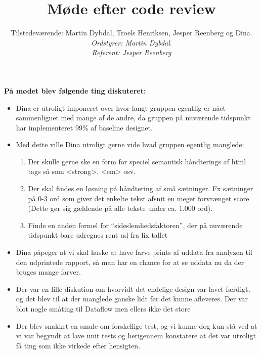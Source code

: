 \documentclass[a4paper,10pt,draft]{article}
\begin{document}
\title{Møde efter code review}
\author{Tilstedeværende: Martin Dybdal, Troels Henriksen, Jesper Reenberg og Dina.\\
\textit{Ordstyrer: Martin Dybdal}.\\
\textit{Referent: Jesper Reenberg}}
\maketitle


\textbf{På mødet blev følgende ting diskuteret:}
\\

\begin{itemize}

\item Dina er utroligt imponeret over hvor langt gruppen egentlig er nået sammenlignet med mange af de andre, da gruppen på nuværende tidspunkt har implementeret 99\% af baseline designet.

\item Med dette ville Dina utroligt gerne vide hvad gruppen egentlig manglede:

\begin{enumerate}
 \item Der skulle gerne ske en form for speciel semantisk håndterings af html tags så som <strong>, <em> osv.
\item Der skal findes en løsning på håndtering af små sætninger. Fx sætninger på 0-3 ord som giver det enkelte tekst afsnit en meget forvrænget score (Dette gør sig gældende på alle tekste under ca. 1.000 ord).
\item Finde en anden formel for ``sideslemhedsfaktoren'', der på nuværende tidspunkt bare udregnes rent ud fra lix tallet
\end{enumerate}

\item Dina påpeger at vi skal huske at have farve prints af uddata fra analyzen til den udprintede rapport, så man har en chance for at se uddata nu da der bruges mange farver.

\item Der var en lille diskution om hvorvidt det endelige design var lavet færdigt, og det blev til at der manglede ganske lidt før det kunne afleveres. Der var blot nogle småting til Dataflow men ellers ikke det store

\item Der blev snakket en smule om forskellige test, og vi kunne dog kun stå ved at vi var begyndt at lave unit tests og herigennem konstatere at det var utroligt få ting som ikke virkede efter hensigten.


\end{itemize}
\end{document}
